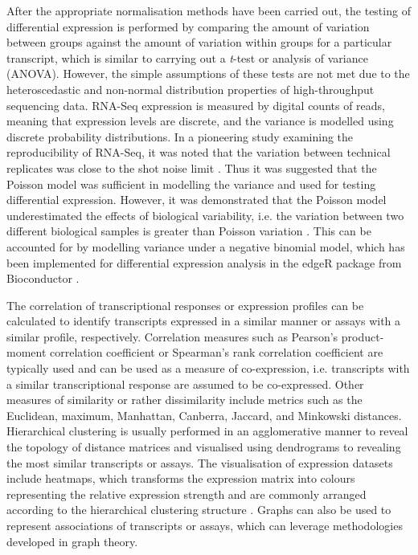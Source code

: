 After the appropriate normalisation methods have been carried out, the testing of differential expression is performed by comparing the amount of variation between groups against the amount of variation within groups for a particular transcript, which is similar to carrying out a \textit{t}-test or analysis of variance (ANOVA). However, the simple assumptions of these tests are not met due to the heteroscedastic and non-normal distribution properties of high-throughput sequencing data. RNA-Seq expression is measured by digital counts of reads, meaning that expression levels are discrete, and the variance is modelled using discrete probability distributions. In a pioneering study examining the reproducibility of RNA-Seq, it was noted that the variation between technical replicates was close to the shot noise limit \citep{pmid18550803}. Thus it was suggested that the Poisson model was sufficient in modelling the variance and used for testing differential expression. However, it was demonstrated that the Poisson model underestimated the effects of biological variability, i.e. the variation between two different biological samples is greater than Poisson variation \citep{20979621}. This can be accounted for by modelling variance under a negative binomial model, which has been implemented for differential expression analysis in the edgeR package \citep{pmid19910308} from Bioconductor \citep{pmid15461798}.

The correlation of transcriptional responses or expression profiles can be calculated to identify transcripts expressed in a similar manner or assays with a similar profile, respectively. Correlation measures such as Pearson's product-moment correlation coefficient or Spearman's rank correlation coefficient are typically used and can be used as a measure of co-expression, i.e. transcripts with a similar transcriptional response are assumed to be co-expressed. Other measures of similarity or rather dissimilarity include metrics such as the Euclidean, maximum, Manhattan, Canberra, Jaccard, and Minkowski distances. Hierarchical clustering is usually performed in an agglomerative manner to reveal the topology of distance matrices and visualised using dendrograms to revealing the most similar transcripts or assays. The visualisation of expression datasets include heatmaps, which transforms the expression matrix into colours representing the relative expression strength and are commonly arranged according to the hierarchical clustering structure \citep{pmid9843981}. Graphs can also be used to represent associations of transcripts or assays, which can leverage methodologies developed in graph theory.

